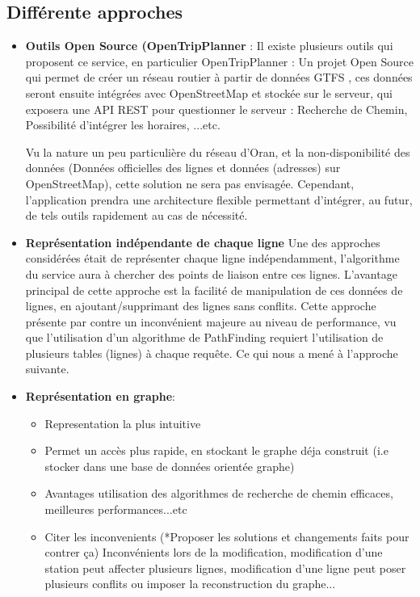 \subsection{Différente approches}
\begin{itemize}
	\item \textbf{Outils Open Source (OpenTripPlanner} : 
	      Il existe plusieurs outils qui proposent ce service, en particulier OpenTripPlanner : Un projet Open Source qui permet de créer un réseau routier à partir de données GTFS , ces données seront ensuite intégrées avec OpenStreetMap et stockée sur le serveur, qui exposera une API REST pour questionner le serveur : Recherche de Chemin, Possibilité d'intégrer les horaires, ...etc.
	      		
	      Vu la nature un peu particulière du réseau d'Oran, et la non-disponibilité des données (Données officielles des lignes et données (adresses) sur OpenStreetMap), cette solution ne sera pas envisagée. 
	      Cependant, l'application prendra une architecture flexible permettant d'intégrer, au futur, de tels outils rapidement au cas de nécessité.
	\item \textbf{Représentation indépendante de chaque ligne}
	      Une des approches considérées était de représenter chaque ligne indépendamment, l'algorithme du service aura à chercher des points de liaison entre ces lignes.
	      L'avantage principal de cette approche est la facilité de manipulation de ces données de lignes, en ajoutant/supprimant des lignes sans conflits.
	      Cette approche présente par contre un inconvénient majeure au niveau de performance, vu que l'utilisation d'un algorithme de PathFinding requiert l'utilisation de plusieurs tables (lignes) à chaque requête. Ce qui nous a mené à l'approche suivante.
	\item \textbf{Représentation en graphe}:
	      	
	      \begin{itemize}
	      	\item Representation la plus intuitive
	      	\item Permet un accès plus rapide, en stockant le graphe déja construit (i.e stocker dans une base de données orientée graphe)
	      	\item Avantages utilisation des algorithmes de recherche de chemin efficaces, meilleures performances...etc
	      	\item Citer les inconvenients (*Proposer les solutions et changements faits pour contrer ça) Inconvénients lors de la modification, modification d'une station peut affecter plusieurs lignes, modification d'une ligne peut poser plusieurs conflits ou imposer la reconstruction du graphe...
	      \end{itemize}
	      
\end{itemize}
